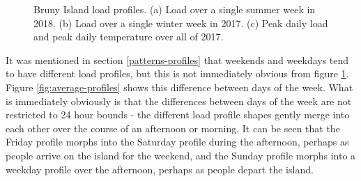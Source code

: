 \begin{figure}[htbp]
	\centering
	\vfil
	\vfil
	\caption{Bruny Island load profiles. (a) Load over a single summer week in 2018. (b) Load over a single winter week in 2017. (c) Peak daily load and peak daily temperature over all of 2017.}
	\label{fig:load-profiles}
\end{figure}

It was mentioned in section \ref{patterns-profiles} that weekends and weekdays tend to have different load profiles, but this is not immediately obvious from figure \ref{fig:load-profiles}.
Figure \ref{fig:average-profiles} shows this difference between days of the week.
What is immediately obviously is that the differences between days of the week are not restricted to 24 hour bounds - the different load profile shapes gently merge into each other over the course of an afternoon or morning.
It can be seen that the Friday profile morphs into the Saturday profile during the afternoon, perhaps as people arrive on the island for the weekend, and the Sunday profile morphs into a weekday profile over the afternoon, perhaps as people depart the island.

